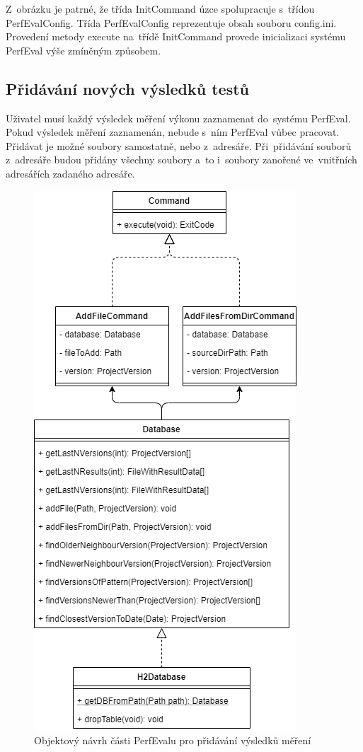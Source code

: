 Z~obrázku je patrné, že třída InitCommand úzce spolupracuje s~třídou PerfEvalConfig. Třída PerfEvalConfig reprezentuje
obsah souboru config.ini. Provedení metody execute na~třídě InitCommand provede inicializaci systému PerfEval výše
zmíněným způsobem.

\subsection{Přidávání nových výsledků testů}

Uživatel musí každý výsledek měření výkonu zaznamenat do~systému PerfEval. Pokud výsledek měření zaznamenán, nebude s~ním
PerfEval vůbec pracovat. Přidávat je možné soubory samostatně, nebo z~adresáře. Při~přidávání souborů z~adresáře budou
přidány všechny soubory a~to i~soubory zanořené ve~vnitřních adresářích zadaného adresáře.

\begin{figure}[!ht]
    \centering
    \includegraphics[height=0.5\textheight]{../img/perfeval_h2db.png}
    \caption{Objektový návrh části PerfEvalu pro přidávání výsledků měření}
\end{figure}


